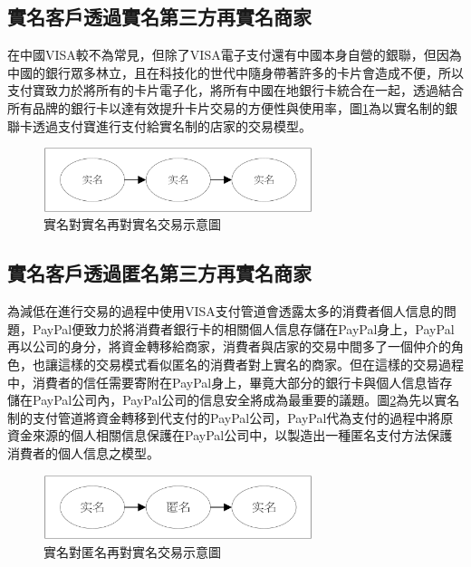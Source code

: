 		\subsection{實名客戶透過實名第三方再實名商家}
		在中國VISA較不為常見，但除了VISA電子支付還有中國本身自營的銀聯，但因為中國的銀行眾多林立，且在科技化的世代中隨身帶著許多的卡片會造成不便，所以支付寶致力於將所有的卡片電子化，將所有中國在地銀行卡統合在一起，透過結合所有品牌的銀行卡以達有效提升卡片交易的方便性與使用率，圖\ref{modennn}為以實名制的銀聯卡透過支付寶進行支付給實名制的店家的交易模型。

		\begin{figure}[h]
			\centering
			\includegraphics[width = 0.7\textwidth]{modennn.png}
			\caption{實名對實名再對實名交易示意圖}\label{modennn}
		\end{figure}

		\subsection{實名客戶透過匿名第三方再實名商家}
		為減低在進行交易的過程中使用VISA支付管道會透露太多的消費者個人信息的問題，PayPal便致力於將消費者銀行卡的相關個人信息存儲在PayPal身上，PayPal再以公司的身分，將資金轉移給商家，消費者與店家的交易中間多了一個仲介的角色，也讓這樣的交易模式看似匿名的消費者對上實名的商家。但在這樣的交易過程中，消費者的信任需要寄附在PayPal身上，畢竟大部分的銀行卡與個人信息皆存儲在PayPal公司內，PayPal公司的信息安全將成為最重要的議題。圖\ref{modenan}為先以實名制的支付管道將資金轉移到代支付的PayPal公司，PayPal代為支付的過程中將原資金來源的個人相關信息保護在PayPal公司中，以製造出一種匿名支付方法保護消費者的個人信息之模型。

		\begin{figure}[h]
			\centering
			\includegraphics[width = 0.7\textwidth]{modenan.png}
			\caption{實名對匿名再對實名交易示意圖}\label{modenan}
		\end{figure}

